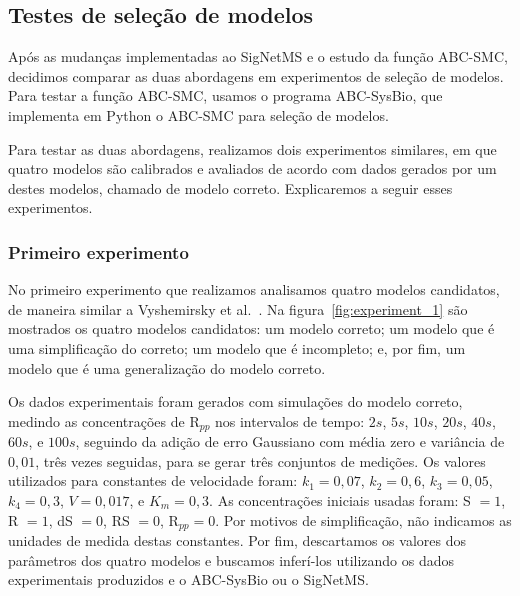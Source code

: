 \documentclass[12pt]{article}
\begin{document}
\subsection{Testes de seleção de modelos}
Após as mudanças implementadas ao SigNetMS e o estudo da função ABC-SMC,
decidimos comparar as duas abordagens em experimentos de seleção de
modelos. Para testar a função ABC-SMC, usamos o programa ABC-SysBio, que
implementa em Python o ABC-SMC para seleção de modelos.

Para testar as duas abordagens, realizamos dois experimentos similares,
em que quatro modelos são calibrados e avaliados de acordo com dados gerados por um
destes modelos, chamado de modelo correto. Explicaremos a seguir esses experimentos.

\subsubsection{Primeiro experimento}
No primeiro experimento que realizamos analisamos quatro modelos 
candidatos, de maneira similar a Vyshemirsky et al.~\cite{Vyshemirsky2008}. Na figura~\ref{fig:experiment_1} são mostrados os
quatro modelos candidatos: um modelo correto; um modelo que é uma
simplificação do correto; um modelo que é incompleto; e, por fim, um
modelo que é uma generalização do modelo correto.

Os dados experimentais foram gerados com simulações do modelo correto,
medindo as concentrações de R$_{pp}$ nos intervalos de tempo: $2s$,
$5s$, $10s$, $20s$, $40s$, $60s$, e $100s$, seguindo da adição de erro
Gaussiano com média zero e variância de $0,01$, três vezes seguidas,
para se gerar três conjuntos de medições. Os valores utilizados para 
constantes de velocidade foram: $k_1 = 0,07$, $k_2 = 0,6$, $k_3 = 0,05$,
$k_4 = 0,3$, $V = 0,017$, e $K_m = 0,3$. As concentrações iniciais
usadas foram: S $= 1$, R $= 1$, dS $= 0$, RS $= 0$, R$_{pp} = 0$. Por
motivos de simplificação, não indicamos as unidades de medida destas
constantes. Por fim, descartamos os valores dos parâmetros dos quatro modelos e buscamos inferí-los utilizando os dados experimentais produzidos e o ABC-SysBio ou o SigNetMS.
\end{document}
